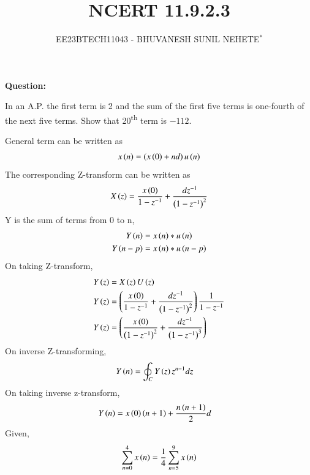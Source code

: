 \documentclass[journal,12pt,twocolumn]{IEEEtran}
\theoremstyle{remark}
\begin{document}

\vspace{3cm}

\title{NCERT 11.9.2.3}
\author{EE23BTECH11043 - BHUVANESH SUNIL NEHETE$^{*}$%
}
\maketitle
\newpage
\bigskip

\renewcommand{\thefigure}{\theenumi}
\renewcommand{\thetable}{\theenumi}



\textbf{Question:}

In an A.P. the first term is 2 and the sum of the first five terms is one-fourth of the next five terms. Show that 20\textsuperscript{th} term is $-112$.

\solution



General term can be written as
\begin{align}
    x\left(n\right) = \left(x\left(0\right) + nd\right)u\left(n\right)
\end{align}
The corresponding Z-transform can be written as 
\begin{align}
    X\left(z\right) = \frac{x\left(0\right)}{1 - z^{-1}} + \frac{dz^{-1}}{\left(1 - z^{-1}\right)^{2}} \label{eq2}
\end{align}
Y is the sum of terms from 0 to n,
    \begin{align}
        Y\left(n\right) &= x\left(n\right) * u\left(n\right)\\
        Y\left(n-p\right) &= x\left(n\right) * u\left(n-p\right)
    \end{align}
On taking Z-transform,
    \begin{align}
        Y\left(z\right) &= X\left(z\right)U\left(z\right)\\
        Y\left(z\right) &= \left(\frac{x\left(0\right)}{1 - z^{-1}} + \frac{dz^{-1}}{\left(1 - z^{-1}\right)^{2}}\right)\frac{1}{1-z^{-1}}\\
        Y\left(z\right) &= \left(\frac{x\left(0\right)}{\left(1 - z^{-1}\right)^2} + \frac{dz^{-1}}{\left(1 - z^{-1}\right)^{3}}\right)
    \end{align}
On inverse Z-transforming, 
    \begin{align}
        Y\left(n\right) &= \oint_{C} Y\left(z\right)z^{n-1}dz
    \end{align}
On taking inverse z-transform,
    \begin{align}
        Y\left(n\right) &= x\left(0\right)\left(n+1\right) + \frac{n\left(n+1\right)}{2}d
    \end{align}
Given, 
   \begin{align}
       \sum_{n=0}^{4}x\left(n\right) = \frac{1}{4}\sum_{n=5}^{9}x\left(n\right)
   \end{align}
\end{document}
